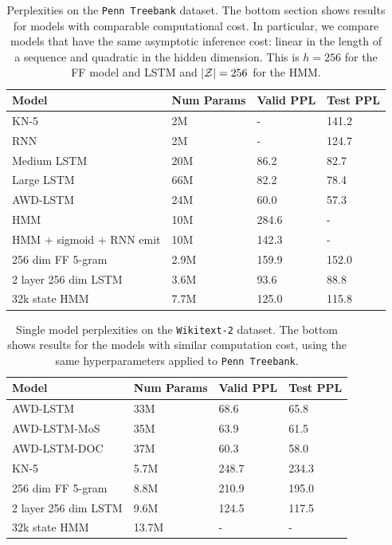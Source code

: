 \documentclass[11pt,a4paper]{article}
\begin{document}
\begin{table}[!t]
\centering
\begin{tabular}{llll}
\toprule
Model & Num Params & Valid PPL & Test PPL\\
\midrule
KN-5 \citep{mikolov2012rnn}  & 2M & - & 141.2\\
RNN \citep{mikolov2012rnn}  & 2M & - & 124.7\\
Medium LSTM \citep{zaremba2014lstm} & 20M & 86.2 & 82.7\\
Large LSTM \citep{zaremba2014lstm} & 66M & 82.2 & 78.4\\
AWD-LSTM \citep{merity2017awdlstm} & 24M & 60.0 & 57.3\\
HMM \citep{buys2018hmm} & 10M & 284.6 & -\\
HMM + sigmoid + RNN emit \citep{buys2018hmm} & 10M & 142.3 & -\\
\midrule
256 dim FF 5-gram  & 2.9M     & 159.9      & 152.0  \\
2 layer 256 dim LSTM  & 3.6M     & 93.6       & 88.8   \\
32k state HMM   & 7.7M     & 125.0      & 115.8  \\
\bottomrule
\end{tabular}
\caption{\label{tbl:ptb-ppl}
Perplexities on the \texttt{Penn Treebank} dataset.
The bottom section shows results for models 
with comparable computational cost.
In particular, we compare models that have the same 
asymptotic inference cost: linear in
the length of a sequence and quadratic in the hidden
dimension.
This is $h=256$ for the FF model and LSTM
and $|\mathcal{Z}| = 256$ for the HMM.
}
\end{table}

\begin{table}[!t]
\centering
\begin{tabular}{llll}
\toprule
Model & Num Params & Valid PPL & Test PPL\\
\midrule
AWD-LSTM \citep{merity2017awdlstm} & 33M & 68.6 & 65.8\\
AWD-LSTM-MoS \citep{mos} & 35M & 63.9 & 61.5\\
AWD-LSTM-DOC \citep{awddoc} & 37M & 60.3 & 58.0\\
KN-5              & 5.7M       & 248.7 & 234.3\\
\midrule
256 dim FF 5-gram        & 8.8M    & 210.9  & 195.0\\
2 layer 256 dim LSTM     & 9.6M    & 124.5  & 117.5\\
32k state HMM            & 13.7M   & -      & -\\
\bottomrule
\end{tabular}
\caption{\label{tbl:wt2-ppl}
Single model perplexities on the \texttt{Wikitext-2} dataset.
The bottom shows results for the models with 
similar computation cost, using the same
hyperparameters applied to \texttt{Penn Treebank}.
}
\end{table}
\end{document}
